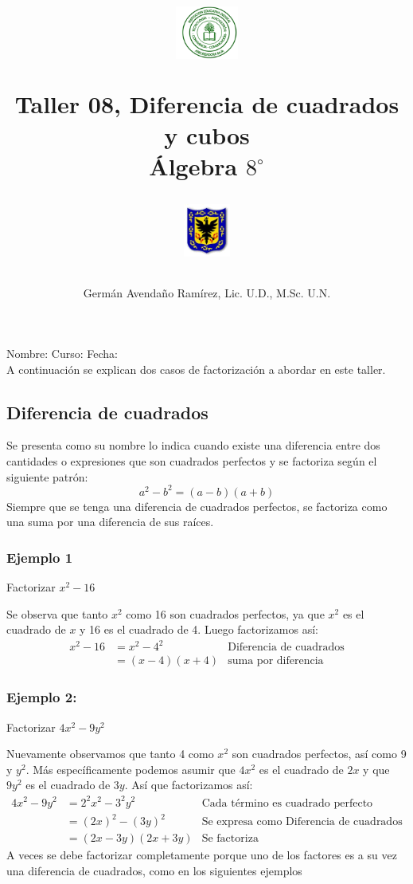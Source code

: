 \documentclass[10pt,twoside]{article}
\author{Germ\'an Avenda\~no Ram\'irez, Lic. U.D., M.Sc. U.N.}
\title{\begin{minipage}{.2\textwidth}
\includegraphics[height=1.75cm]{Images/logo-colegio.png}\end{minipage}
\begin{minipage}{.55\textwidth}
\begin{center}
Taller 08, Diferencia de cuadrados y cubos\\
Álgebra $8^{\circ}$
\end{center}
\end{minipage}\hfill
\begin{minipage}{.2\textwidth}
\includegraphics[height=1.75cm]{Images/logo-sed.png} 
\end{minipage}}
\date{}
\begin{document}
\maketitle
Nombre: \hrulefill Curso: \underline{\hspace*{44pt}} Fecha: \underline{\hspace*{2.5cm}}\\

A continuaci\'{o}n se explican dos casos de factorizaci\'{o}n a abordar en este taller.
\subsection*{Diferencia de cuadrados}
Se presenta como su nombre lo indica cuando existe una diferencia entre dos cantidades o expresiones que son cuadrados perfectos y se factoriza seg\'{u}n el siguiente patr\'{o}n:
\[a^{2}-b^{2}=(a-b)(a+b)\]
Siempre que se tenga una diferencia de cuadrados perfectos, se factoriza como una suma por una diferencia de sus ra\'{i}ces.
\subsubsection*{Ejemplo 1}
Factorizar $x^{2}-16$

Se observa que tanto $x^{2}$ como 16 son cuadrados perfectos, ya que $x^{2}$ es el cuadrado de $x$ y 16 es el cuadrado de 4. Luego factorizamos as\'{i}:
\begin{align*}
x^{2}-16&=x^{2}-4^{2} & \mbox{Diferencia de cuadrados}\\
&=(x-4)(x+4) & \mbox{suma por diferencia}
\end{align*}
\subsubsection*{Ejemplo 2:}
Factorizar $4x^{2}-9y^{2}$

Nuevamente observamos que tanto 4 como $x^{2}$ son cuadrados perfectos, as\'{i} como 9 y $y^{2}$. M\'{a}s espec\'{i}ficamente podemos asumir que $4x^{2}$ es el cuadrado de $2x$ y que $9y^{2}$ es el cuadrado de $3y$. As\'{i} que factorizamos as\'{i}:
\begin{align*}
4x^{2}-9y^{2}&=2^{2}x^{2}-3^{2}y^{2} & \mbox{Cada término es cuadrado perfecto}\\
&=(2x)^{2}-(3y)^{2}& \mbox{Se expresa como Diferencia de cuadrados}\\
&=(2x-3y)(2x+3y) & \mbox{Se factoriza}
\end{align*}
A veces se debe factorizar completamente porque uno de los factores es a su vez una diferencia de cuadrados, como en los siguientes ejemplos
\end{document}
